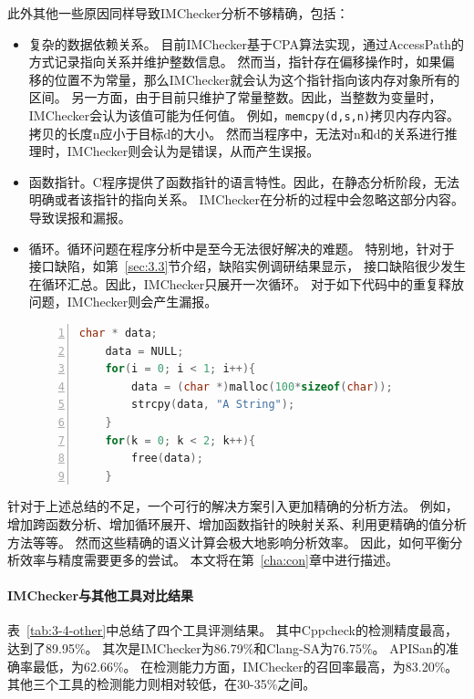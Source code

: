 此外其他一些原因同样导致IMChecker分析不够精确，包括：
\begin{itemize}
	\item 复杂的数据依赖关系。
	目前IMChecker基于CPA算法实现，通过AccessPath的方式记录指向关系并维护整数信息。
	然而当，指针存在偏移操作时，如果偏移的位置不为常量，那么IMChecker就会认为这个指针指向该内存对象所有的区间。
	另一方面，由于目前只维护了常量整数。因此，当整数为变量时，IMChecker会认为该值可能为任何值。
	例如，\texttt{memcpy(d,s,n)}拷贝内存内容。拷贝的长度n应小于目标d的大小。
	然而当程序中，无法对n和d的关系进行推理时，IMChecker则会认为是错误，从而产生误报。
	\item 函数指针。C程序提供了函数指针的语言特性。因此，在静态分析阶段，无法明确或者该指针的指向关系。
	IMChecker在分析的过程中会忽略这部分内容。导致误报和漏报。
	\item 循环。循环问题在程序分析中是至今无法很好解决的难题。
	特别地，针对于接口缺陷，如第~\ref{sec:3.3}节介绍，缺陷实例调研结果显示，
	接口缺陷很少发生在循环汇总。因此，IMChecker只展开一次循环。
	对于如下代码中的重复释放问题，IMChecker则会产生漏报。
\begin{lstlisting}[language={C},
basicstyle=\linespread{0.7}\listingsfont,
numbers=left,
xleftmargin=.2\textwidth]
	char * data;
	data = NULL;
	for(i = 0; i < 1; i++){
		data = (char *)malloc(100*sizeof(char));
		strcpy(data, "A String");
	}
	for(k = 0; k < 2; k++){
		free(data);
	}
\end{lstlisting}	
\end{itemize}

针对于上述总结的不足，一个可行的解决方案引入更加精确的分析方法。
例如，增加跨函数分析、增加循环展开、增加函数指针的映射关系、利用更精确的值分析方法等等。
然而这些精确的语义计算会极大地影响分析效率。
因此，如何平衡分析效率与精度需要更多的尝试。
本文将在第~\ref{cha:con}章中进行描述。

\paragraph{IMChecker与其他工具对比结果}



表~\ref{tab:3-4-other}中总结了四个工具评测结果。
其中Cppcheck的检测精度最高，达到了89.95\%。
其次是IMChecker为86.79\%和Clang-SA为76.75\%。
APISan的准确率最低，为62.66\%。
在检测能力方面，IMChecker的召回率最高，为83.20\%。
其他三个工具的检测能力则相对较低，在30-35\%之间。

